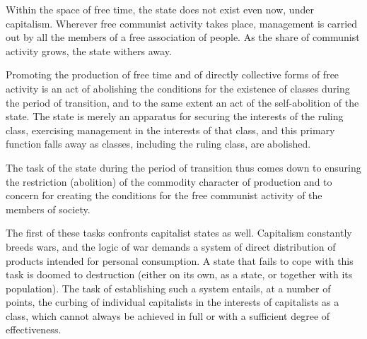 \documentclass[12pt,a4paper,openany]{book}
\begin{document}
Within the space of free time, the state does not exist even now, under capitalism. Wherever free communist activity takes place, management is carried out by all the members of a free association of people. As the share of communist activity grows, the state withers away.

Promoting the production of free time and of directly collective forms of free activity is an act of abolishing the conditions for the existence of classes during the period of transition, and to the same extent an act of the self-abolition of the state. The state is merely an apparatus for securing the interests of the ruling class, exercising management in the interests of that class, and this primary function falls away as classes, including the ruling class, are abolished.

The task of the state during the period of transition thus comes down to ensuring the restriction (abolition) of the commodity character of production and to concern for creating the conditions for the free communist activity of the members of society.

The first of these tasks confronts capitalist states as well. Capitalism constantly breeds wars, and the logic of war demands a system of direct distribution of products intended for personal consumption. A state that fails to cope with this task is doomed to destruction (either on its own, as a state, or together with its population). The task of establishing such a system entails, at a number of points, the curbing of individual capitalists in the interests of capitalists as a class, which cannot always be achieved in full or with a sufficient degree of effectiveness.
\end{document}
